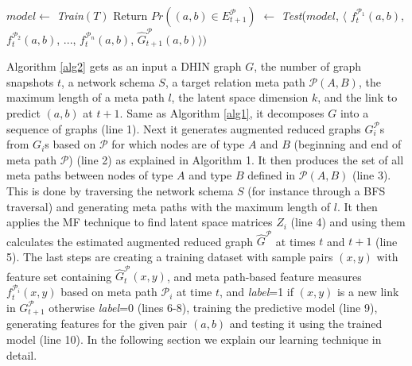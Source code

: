 \begin{algorithm}[t]
\begin{algorithmic}[1]
\ENDFOR



\STATE $model \leftarrow$ \textit{Train}$(T)$
\STATE Return $Pr((a,b)\in E^\mathcal{P}_{t+1})$ $\leftarrow$ \textit{Test}($model$, $\langle$ $f^{\mathcal{P}_1}_{t}(a,b)$, $f^{\mathcal{P}_2}_{t}(a,b)$, ..., $f^{\mathcal{P}_n}_{t}(a,b)$, $\hat{G}^\mathcal{P}_{t+1}(a,b)\rangle)$

\end{algorithmic}
\end{algorithm}

Algorithm \ref{alg2} gets as an input a DHIN graph $G$, the number of graph snapshots $t$, a network schema $S$, a target relation meta path $\mathcal{P}(A,B)$, the maximum length of a meta path $l$, the latent space dimension $k$, and the link to predict $(a,b)$ at $t+1$. Same as Algorithm \ref{alg1}, it decomposes $G$ into a sequence of graphs (line 1). Next it generates augmented reduced graphs $G^\mathcal{P}_i$s from $G_i$s based on $\mathcal{P}$ for which nodes are of type $A$ and $B$ (beginning and end of meta path $\mathcal{P}$) (line 2) as explained in Algorithm 1. It then produces the set of all meta paths between nodes of type $A$ and type $B$ defined in $\mathcal{P}(A,B)$ (line 3). This is done by traversing the network schema $S$ (for instance through a BFS traversal) and generating meta paths with the maximum length of $l$. It then applies the MF technique \cite{Zhu2016} to find latent space matrices $Z_i$ (line 4) and using them calculates the estimated augmented reduced graph $\hat{G}^\mathcal{P}$ at times $t$ and $t+1$ (line 5). The last steps are creating a training dataset with sample pairs $(x,y)$ with feature set containing $\hat{G}^\mathcal{P}_{t}(x,y)$, and meta path-based feature measures $f^{\mathcal{P}_i}_t(x,y)$ based on meta path $\mathcal{P}_i$ at time $t$, and \textit{label}=1 if $(x,y)$ is a new link in $G^\mathcal{P}_{t+1}$ otherwise \textit{label}=0 (lines 6-8), training the predictive model (line 9), generating features for the given pair $(a,b)$ and testing it using the trained model (line 10). In the following section we explain our learning technique in detail.

